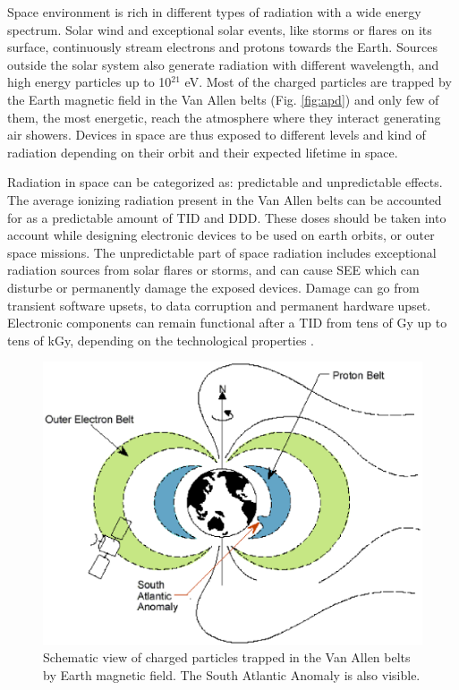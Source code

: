 \documentclass[twoside,a4paper]{article}
\begin{document}
Space environment is rich in different types of radiation with a wide energy spectrum. Solar wind and exceptional solar events, like storms or flares on its surface, continuously stream electrons and protons towards the Earth. Sources outside the solar system also generate radiation with different wavelength, and high energy particles up to 10$^{21}$ eV.
Most of the charged particles are trapped by the Earth magnetic field in the Van Allen belts (Fig. \ref{fig:apd}) and only few of them, the most energetic, reach the atmosphere where they interact generating air showers. Devices in space are thus exposed to different levels and kind of radiation depending on their orbit and their expected lifetime in space.

Radiation in space can be categorized as: predictable and unpredictable effects. 
The average ionizing radiation present in the Van Allen belts can be accounted for as a predictable amount of TID and DDD. These doses should be taken into account while designing electronic devices to be used on earth orbits, or outer space missions. The unpredictable part of space radiation includes exceptional radiation sources from solar flares or storms, and can cause SEE which can disturbe or permanently damage the exposed devices. Damage can go from transient software upsets, to data corruption and permanent hardware upset. Electronic components can remain functional after a TID from tens of Gy up to tens of kGy, depending on the technological properties \cite{space}.

\begin{figure}[h!]
\includegraphics  [width = 0.8  \textwidth] {RadiationBelts.eps}
\caption{Schematic view of charged particles trapped in the Van Allen belts by Earth magnetic field. The South Atlantic Anomaly is also visible.}
\label{fig:space}
\end{figure}
\end{document}
